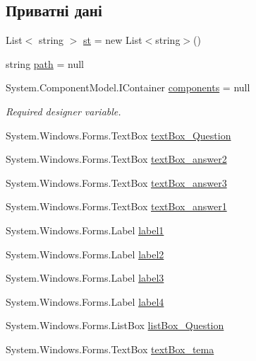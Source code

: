 \subsection*{Приватні дані}
\begin{DoxyCompactItemize}
\item 
List$<$ string $>$ \hyperlink{class_tests_1_1_adminka_a330050adb0204a625889fb83a3076020}{st} = new List$<$string$>$()
\item 
string \hyperlink{class_tests_1_1_adminka_aee4c653fce4f868e0443f71f103073f5}{path} = null
\item 
System.\+Component\+Model.\+I\+Container \hyperlink{class_tests_1_1_adminka_aa90b2e5b943bff4a2d5f567cd0440ace}{components} = null
\begin{DoxyCompactList}\small\item\em Required designer variable. \end{DoxyCompactList}\item 
System.\+Windows.\+Forms.\+Text\+Box \hyperlink{class_tests_1_1_adminka_ae9d52a9b2893c5ea478b87306fb97bb5}{text\+Box\+\_\+\+Question}
\item 
System.\+Windows.\+Forms.\+Text\+Box \hyperlink{class_tests_1_1_adminka_afff68b1022251085154e49d62a23384c}{text\+Box\+\_\+answer2}
\item 
System.\+Windows.\+Forms.\+Text\+Box \hyperlink{class_tests_1_1_adminka_ae3b9da7c9adc45d124cd949d7e36fa49}{text\+Box\+\_\+answer3}
\item 
System.\+Windows.\+Forms.\+Text\+Box \hyperlink{class_tests_1_1_adminka_a6ddfc84b04cb9ee0da0d214993156a13}{text\+Box\+\_\+answer1}
\item 
System.\+Windows.\+Forms.\+Label \hyperlink{class_tests_1_1_adminka_a79972d46b6074e3267bc67a0ebb2b469}{label1}
\item 
System.\+Windows.\+Forms.\+Label \hyperlink{class_tests_1_1_adminka_a4e29fe60d58caf22ebd38a346fe0642b}{label2}
\item 
System.\+Windows.\+Forms.\+Label \hyperlink{class_tests_1_1_adminka_a1fd7ef809e9adab2568fd45e3b2c2206}{label3}
\item 
System.\+Windows.\+Forms.\+Label \hyperlink{class_tests_1_1_adminka_a6d79a07b77f8747b51fc2fdae76cd37e}{label4}
\item 
System.\+Windows.\+Forms.\+List\+Box \hyperlink{class_tests_1_1_adminka_a2fdae13c03c82b36031341dd4990803f}{list\+Box\+\_\+\+Question}
\item 
System.\+Windows.\+Forms.\+Text\+Box \hyperlink{class_tests_1_1_adminka_a8636ea15196a859ed3d64c6f32ea5afc}{text\+Box\+\_\+tema}

\end{DoxyCompactItemize}
